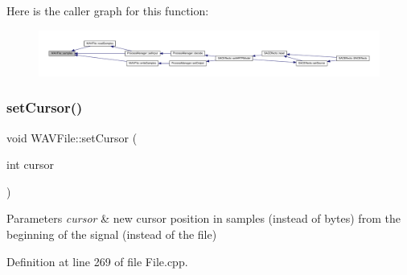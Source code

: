 Here is the caller graph for this function\+:
\nopagebreak
\begin{figure}[H]
\begin{center}
\leavevmode
\includegraphics[width=350pt]{class_w_a_v_file_a9ca294afee7e0c17ac00cd37b56dafd6_icgraph}
\end{center}
\end{figure}
\mbox{\label{class_w_a_v_file_af9ffb0dd3ec2746708dd25546b2e7afd}} 
\subsubsection{\texorpdfstring{set\+Cursor()}{setCursor()}}
{\footnotesize\ttfamily void W\+A\+V\+File\+::set\+Cursor (\begin{DoxyParamCaption}\item[{int}]{cursor }\end{DoxyParamCaption})}


\begin{DoxyParams}{Parameters}
{\em cursor} & new cursor position in samples (instead of bytes) from the beginning of the signal (instead of the file) \\
\hline
\end{DoxyParams}


Definition at line 269 of file File.\+cpp.

